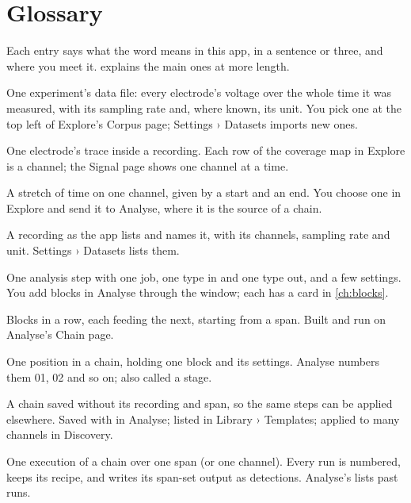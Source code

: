 \chapter{Glossary}\label{ch:glossary}
Each entry says what the word means in this app, in a sentence or three, and where you meet
it.  explains the main ones at more length.

\begin{glossarylist}
 One experiment's data file: every electrode's voltage over
the whole time it was measured, with its sampling rate and, where known, its unit. You pick
one at the top left of Explore's Corpus page; Settings › Datasets imports new ones.

 One electrode's trace inside a recording. Each row of the
coverage map in Explore is a channel; the Signal page shows one channel at a time.

 A stretch of time on one channel, given by a start and an end. You
choose one in Explore and send it to Analyse, where it is the source of a chain.

 A recording as the app lists and names it, with its channels,
sampling rate and unit. Settings › Datasets lists them. 

 One analysis step with one job, one type in and one type out, and a
few settings. You add blocks in Analyse through the  window; each has a
card in \cref{ch:blocks}.

 Blocks in a row, each feeding the next, starting from a span. Built
and run on Analyse's Chain page.

 One position in a chain, holding one block and its settings. Analyse
numbers them \textsf{01}, \textsf{02} and so on; also called a stage.

 A chain saved without its recording and span, so the same
steps can be applied elsewhere. Saved with  in Analyse; listed in Library ›
Templates; applied to many channels in Discovery.

 One execution of a chain over one span (or one channel). Every run is
numbered, keeps its recipe, and writes its span-set output as detections. Analyse's
 lists past runs.


\end{glossarylist}
